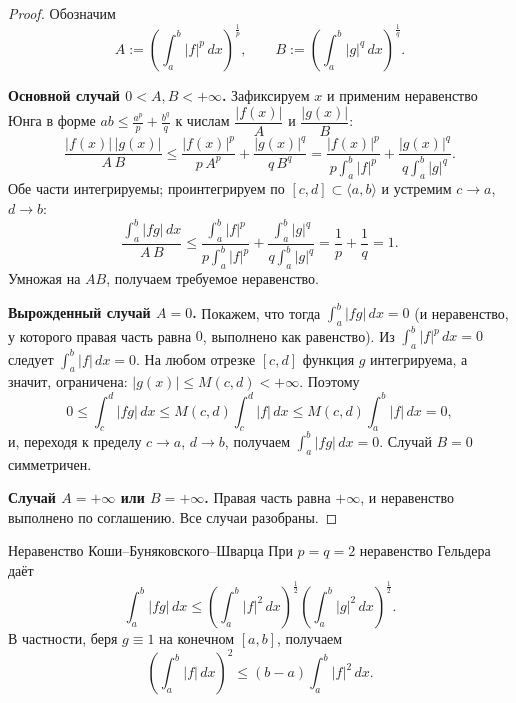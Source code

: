 \begin{proof}
	Обозначим
	\[
	A:=\left(\int_a^b |f|^p\,dx\right)^{\frac1p},
	\qquad
	B:=\left(\int_a^b |g|^q\,dx\right)^{\frac1q}.
	\]

	\textbf{Основной случай $0<A,B<+\infty$.} Зафиксируем $x$ и применим
	неравенство Юнга в форме $ab\le\frac{a^p}{p}+\frac{b^q}{q}$ к числам
	$\dfrac{|f(x)|}{A}$ и $\dfrac{|g(x)|}{B}$:
	\[
	\frac{|f(x)|\,|g(x)|}{A\,B}
	\le
	\frac{|f(x)|^p}{p\,A^p}+\frac{|g(x)|^q}{q\,B^q}
	=\frac{|f(x)|^p}{p\int_a^b|f|^p}+\frac{|g(x)|^q}{q\int_a^b|g|^q}.
	\]
	Обе части интегрируемы; проинтегрируем по $[c,d]\subset\langle a,b\rangle$ и
	устремим $c\to a$, $d\to b$:
	\[
	\frac{\int_a^b |f g|\,dx}{A\,B}
	\le
	\frac{\int_a^b|f|^p}{p\int_a^b|f|^p}+\frac{\int_a^b|g|^q}{q\int_a^b|g|^q}
	=\frac1p+\frac1q=1.
	\]
	Умножая на $AB$, получаем требуемое неравенство.

	\textbf{Вырожденный случай $A=0$.} Покажем, что тогда
	$\int_a^b|fg|\,dx=0$ (и неравенство, у которого правая часть равна $0$,
	выполнено как равенство). Из $\int_a^b|f|^p\,dx=0$ следует
	$\int_a^b|f|\,dx=0$. На любом отрезке $[c,d]$ функция $g$ интегрируема, а
	значит, ограничена: $|g(x)|\le M(c,d)<+\infty$. Поэтому
	\[
	0\le\int_c^d|fg|\,dx\le M(c,d)\int_c^d|f|\,dx\le M(c,d)\int_a^b|f|\,dx=0,
	\]
	и, переходя к пределу $c\to a$, $d\to b$, получаем $\int_a^b|fg|\,dx=0$.
	Случай $B=0$ симметричен.

	\textbf{Случай $A=+\infty$ или $B=+\infty$.} Правая часть равна $+\infty$, и
	неравенство выполнено по соглашению. Все случаи разобраны.
\end{proof}

\begin{Corollary}{Неравенство Коши--Буняковского--Шварца}{}
	При $p=q=2$ неравенство Гельдера даёт
	\[
	\int_a^b |f g|\,dx
	\le
	\left(\int_a^b |f|^{2}\,dx\right)^{\!\frac12}
	\left(\int_a^b |g|^{2}\,dx\right)^{\!\frac12}.
	\]
	В частности, беря $g\equiv1$ на конечном $[a,b]$, получаем
	\[
	\left(\int_a^b |f|\,dx\right)^{2}\le (b-a)\int_a^b |f|^{2}\,dx.
	\]
\end{Corollary}
